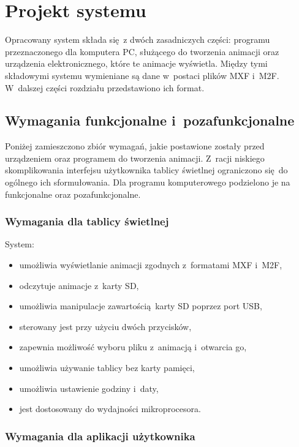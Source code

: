 \chapter{Projekt systemu}

Opracowany system składa się z dwóch zasadniczych części: programu przeznaczonego dla komputera PC, służącego do tworzenia animacji oraz urządzenia elektronicznego, które te animacje wyświetla. Między tymi składowymi systemu wymieniane są dane w~postaci plików MXF i~M2F. W~dalszej części rozdziału przedstawiono ich format.

\section{Wymagania funkcjonalne i~pozafunkcjonalne}

Poniżej zamieszczono zbiór wymagań, jakie postawione zostały przed urządzeniem oraz programem do tworzenia animacji. Z~racji niskiego skomplikowania interfejsu użytkownika tablicy świetlnej ograniczono się do ogólnego ich sformułowania. Dla programu komputerowego podzielono je na funkcjonalne oraz pozafunkcjonalne.

\subsection{Wymagania dla tablicy świetlnej}

System:
\begin{itemize}
	\item umożliwia wyświetlanie animacji zgodnych z~formatami MXF i~M2F,
	\item odczytuje animacje z~karty SD,
	\item umożliwia manipulacje zawartością karty SD poprzez port USB,
	\item sterowany jest przy użyciu dwóch przycisków,
	\item zapewnia możliwość wyboru pliku z~animacją i~otwarcia go,
	\item umożliwia używanie tablicy bez karty pamięci,
	\item umożliwia ustawienie godziny i~daty,
	\item jest dostosowany do wydajności mikroprocesora.
\end{itemize}

\newpage 

\subsection{Wymagania dla aplikacji użytkownika}


